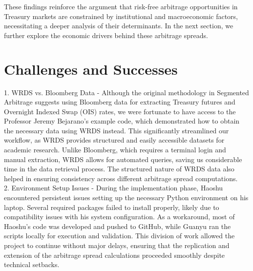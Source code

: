 \documentclass{article}
\begin{document}
These findings reinforce the argument that risk-free arbitrage opportunities in Treasury markets are constrained by institutional and macroeconomic factors, necessitating a deeper analysis of their determinants. In the next section, we further explore the economic drivers behind these arbitrage spreads.




\newpage




\section{Challenges and Successes}

1. WRDS vs. Bloomberg Data - Although the original methodology in Segmented Arbitrage suggests using Bloomberg data for extracting Treasury futures and Overnight Indexed Swap (OIS) rates, we were fortunate to have access to the Professor Jeremy Bejarano’s example code, which demonstrated how to obtain the necessary data using WRDS instead. This significantly streamlined our workflow, as WRDS provides structured and easily accessible datasets for academic research. Unlike Bloomberg, which requires a terminal login and manual extraction, WRDS allows for automated queries, saving us considerable time in the data retrieval process. The structured nature of WRDS data also helped in ensuring consistency across different arbitrage spread computations. \\


2. Environment Setup Issues - During the implementation phase, Haoshu encountered persistent issues setting up the necessary Python environment on his laptop. Several required packages failed to install properly, likely due to compatibility issues with his system configuration. As a workaround, most of Haoshu’s code was developed and pushed to GitHub, while Guanyu ran the scripts locally for execution and validation. This division of work allowed the project to continue without major delays, ensuring that the replication and extension of the arbitrage spread calculations proceeded smoothly despite technical setbacks.
\end{document}
